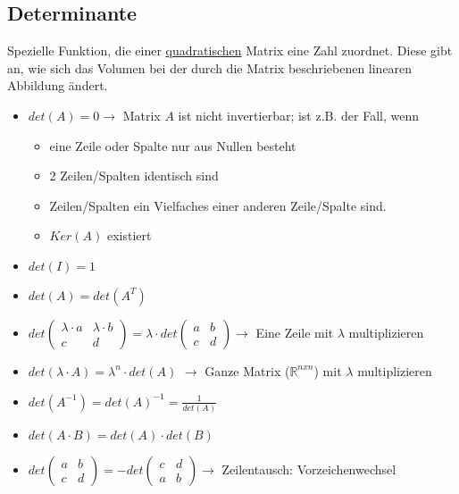 \subsection{Determinante}

Spezielle Funktion, die einer \underline{quadratischen} Matrix eine Zahl zuordnet. Diese gibt an, wie sich das Volumen bei der durch die Matrix beschriebenen linearen Abbildung ändert. \\

\begin{itemize}
    \item \(det(A)= 0\rightarrow\) Matrix \(A\) ist nicht invertierbar; ist z.B. der Fall, wenn
    \begin{itemize}
        \item eine Zeile oder Spalte nur aus Nullen besteht
        \item 2 Zeilen/Spalten identisch sind
        \item Zeilen/Spalten ein Vielfaches einer anderen Zeile/Spalte sind.
        \item \(Ker(A)\) existiert
    \end{itemize}
    \item \(det(I) = 1\)
    \item \(det(A) = det(A^T)\)
    \item \(det\begin{pmatrix}
            \lambda \cdot a & \lambda \cdot b \\
            c & d
        \end{pmatrix} = \lambda \cdot det\begin{pmatrix}
            a & b \\
            c & d
        \end{pmatrix} \rightarrow\) Eine Zeile mit \( \lambda \) multiplizieren
    \item \(det(\lambda\cdot A) = \lambda^n \cdot det(A)\) \(\rightarrow\) Ganze Matrix (\(\mathbb{R}^{nxn}\)) mit \( \lambda \) multiplizieren
    \item \(det(A^{-1}) = det(A)^{-1}=\frac{1}{det(A)}\)
    \item \(det(A\cdot B) = det(A)\cdot det(B)\)
    \item \(det\begin{pmatrix}
            a & b \\
            c & d
        \end{pmatrix} = -det\begin{pmatrix}
            c & d \\
            a & b
        \end{pmatrix}\rightarrow\) Zeilentausch: Vorzeichenwechsel
\end{itemize}



